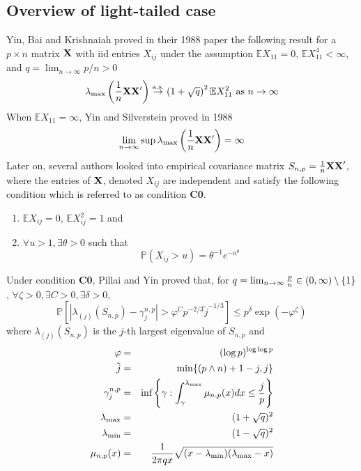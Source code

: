 \documentclass[11pt,reqno]{amsart}
\newcommand{\E}{\mathbb{E}}
\renewcommand{\P}{\mathbb{P}}
\newcommand{\1}{\mathds{1}}
\newcommand{\0}{\boldsymbol{0}}
\newcommand{\M}{\text{max}}
\newcommand{\m}{\text{min}}
\newcommand{\4}{\mathchoice{\mskip1.5mu}{\mskip1.5mu}{}{}}
\newcommand{\5}{\mathchoice{\mskip-1.5mu}{\mskip-1.5mu}{}{}}
\newcommand{\2}{\penalty250\mskip\thickmuskip\mskip-\thinmuskip} %
\newcommand{\as}{{\rm a.s.}}
\begin{document}
\subsection{Overview of light-tailed case}\label{sec:light_tail_review}
Yin, Bai and Krishnaiah proved in their 1988 paper
\cite{yin:bai:Krishnaiah:1988} the following result for a $p \times n$
matrix $\bf X$ with iid entries $X_{ij}$ under the assumption $\E
X_{11} = 0$, $\E X_{11}^4 < \infty$, and $q = \lim_{n \to \infty} p/n
> 0$
\[
\lambda_{\M}\left({1 \over n}\bf{XX'}\right) \overset{\as}{\to} \left(
  1 + \sqrt{q}
\right)^2 \E X_{11}^2 \text{ as }n \to \infty
\]
When $\E X_{11} = \infty$, Yin and Silverstein proved in 1988
\cite{yin:silverstein:1988}
\[
\lim_{n \to \infty} \sup \lambda_{\M}\left({1 \over
    n}\bf{XX'}\right) = \infty
\]
Later on, several authors \cite{Pillai:Yin:2011, tao:vu:2012,
  Wang:2012} looked into empirical covariance matrix $S_{n, p} = {1
  \over n} \bf{XX}'$, where the entries of $\bf X$, denoted $X_{ij}$
are independent and satisfy the following condition which is referred
to as condition {\bf C0}.
\begin{enumerate}
\item $\E X_{ij} = 0$, $\E X_{ij}^2 = 1$ and
\item $\forall u > 1, \exists \theta > 0$ such that
  \[
  \P(X_{ij} > u) = \theta^{-1} e^{-u^{\theta}}
  \]
\end{enumerate}
Under condition {\bf C0}, Pillai and Yin \cite{Pillai:Yin:2011} proved
that, for $q = \lim_{n \to \infty} {p \over n} \in (0, \infty)
\setminus \{1\}$, $\forall \zeta > 0, \exists C > 0, \exists \delta >
0$,
\[
\P\left[
  \left|
    \lambda_{(j)}(S_{n,p}) - \gamma_{j}^{n, p}
  \right| > \varphi^{C} p^{-2/3} \tilde{j}^{-1/3}
\right] \leq p^{\delta} \exp(-\varphi^\zeta)
\]
where $\lambda_{(j)}(S_{n,p})$ is the $j$-th largest eigenvalue of
$S_{n,p}$ and
\begin{eqnarray*}
  \varphi &=& (\log p)^{\log \log p} \\
  \tilde j &=& \min\{(p \wedge n) + 1 - j, j\} \\
  \gamma_{j}^{n, p} &=& \text{inf}\left\{\gamma: \int_\gamma^{\lambda_\M}
  \mu_{n,p}(x) dx \leq {j \over p}\right\} \\
  \lambda_\M &=& (1 + \sqrt q)^2 \\
  \lambda_\m &=& (1 - \sqrt q)^2 \\
  \mu_{n,p}(x) &=& {1 \over 2\pi q x} \sqrt{(x - \lambda_\m)(\lambda_\M - x)}
\end{eqnarray*}
\end{document}
